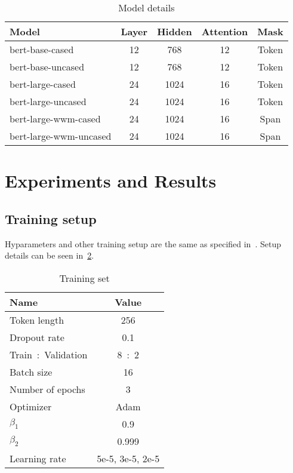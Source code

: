 \documentclass{amsart}
\begin{document}
\begin{table}  
    \centering
    \caption{Model details}
    \label{tbl:model-details}
\begin{tabular}{ l  c  c  c  c }
    \toprule
    Model    & Layer  & Hidden  & Attention & Mask      \\
    \midrule
    bert-base-cased   & 12    & 768    & 12   & Token  \\
    bert-base-uncased   & 12    & 768    & 12   & Token \\
    bert-large-cased    & 24     & 1024    & 16  & Token \\
    bert-large-uncased   & 24    & 1024   & 16    & Token \\
    bert-large-wwm-cased  & 24    & 1024    & 16   & Span  \\
    bert-large-wwm-uncased & 24    & 1024    & 16    & Span \\
     \bottomrule
\end{tabular}
\end{table}


\section{Experiments and Results} \label{sec-experiments}

\subsection{Training setup}
Hyparameters and other training setup are the same as specified in~\cite{devlin2018bert}. Setup details can be seen in~\cref{tbl:training-setup}.

\begin{table}  
    \centering
    \caption{Training set}
    \label{tbl:training-setup}
\begin{tabular}{ l  c }
    \toprule
    Name  & Value \\
    \midrule
    Token length   & 256     \\
	Dropout rate     & 0.1    \\
    Train\ :\ Validation         & 8\ :\ 2   \\
    Batch size         & 16   \\
	Number of epochs         & 3   \\
	Optimizer         & Adam      \\
	$\beta_1$          & 0.9    \\
	$\beta_2$         & 0.999   \\
    Learning rate   & 5e-5, 3e-5, 2e-5   \\
     \bottomrule
\end{tabular}
\end{table}
\end{document}
